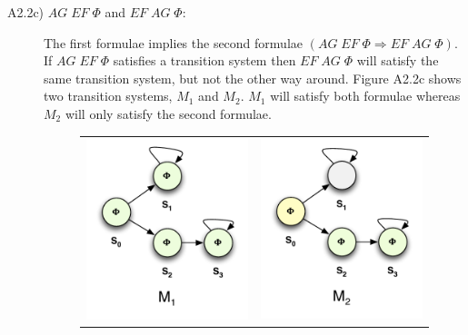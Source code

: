 \documentclass[12pt]{report}
\begin{document}
\begin{description}
	\item[A2.2c) $AG \; EF \; \Phi$ and $EF \; AG \; \Phi$:]
		The first formulae implies the second formulae $\left(AG \; EF \; \Phi \Rightarrow EF \; AG \; \Phi\right)$.\\
		If $AG \; EF \; \Phi$ satisfies a transition system then $EF \; AG \; \Phi$ will satisfy the same transition system, but not the other way around. Figure A2.2c shows two transition systems, $M_1$ and $M_2$. $M_1$ will satisfy both formulae whereas $M_2$ will only satisfy the second formulae.
		\begin{figure}[H]
			\centering
			\begin{tabular}{ l r }
				\includegraphics[scale=0.75]{../GFX/Answer-A2-2c-1.pdf}
				& \includegraphics[scale=0.75]{../GFX/Answer-A2-2c-2.pdf}

\end{tabular}
\end{figure}
\end{description}
\end{document}
